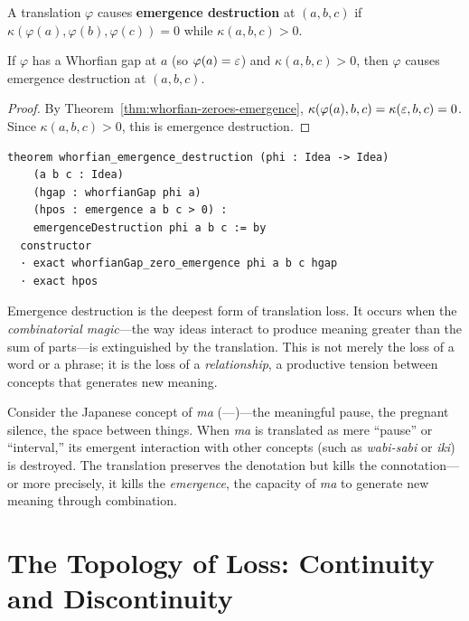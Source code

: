 \begin{definition}
\label{def:emergence-destruction}
A translation $\varphi$ causes \textbf{emergence destruction} at
$(a, b, c)$ if $\kappa(\varphi(a), \varphi(b), \varphi(c)) = 0$ while
$\kappa(a, b, c) > 0$.
\end{definition}

\begin{theorem}
\label{thm:whorfian-emergence-destruction}
If $\varphi$ has a Whorfian gap at $a$ (so $\varphi(a) = \varepsilon$) and
$\kappa(a, b, c) > 0$, then $\varphi$ causes emergence destruction at
$(a, b, c)$.
\end{theorem}

\begin{proof}
By Theorem~\ref{thm:whorfian-zeroes-emergence},
$\kappa(\varphi(a), b, c) = \kappa(\varepsilon, b, c) = 0$.
Since $\kappa(a, b, c) > 0$, this is emergence destruction.
\end{proof}

\begin{lstlisting}
theorem whorfian_emergence_destruction (phi : Idea -> Idea)
    (a b c : Idea)
    (hgap : whorfianGap phi a)
    (hpos : emergence a b c > 0) :
    emergenceDestruction phi a b c := by
  constructor
  · exact whorfianGap_zero_emergence phi a b c hgap
  · exact hpos
\end{lstlisting}

\begin{interpretation}
\label{int:emergence-loss}
Emergence destruction is the deepest form of translation loss.  It occurs
when the \emph{combinatorial magic}---the way ideas interact to produce
meaning greater than the sum of parts---is extinguished by the translation.
This is not merely the loss of a word or a phrase; it is the loss of a
\emph{relationship}, a productive tension between concepts that generates
new meaning.

Consider the Japanese concept of \emph{ma} (---)---the meaningful
pause, the pregnant silence, the space between things.  When \emph{ma} is
translated as mere ``pause'' or ``interval,'' its emergent interaction with
other concepts (such as \emph{wabi-sabi} or \emph{iki}) is destroyed.
The translation preserves the denotation but kills the connotation---or
more precisely, it kills the \emph{emergence}, the capacity of \emph{ma}
to generate new meaning through combination.
\end{interpretation}

\section{The Topology of Loss: Continuity and Discontinuity}
\label{sec:untranslatable:topology}

